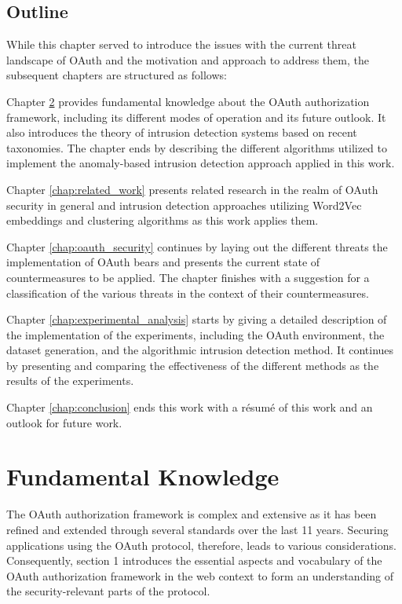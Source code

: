 \documentclass[
    fontsize=12pt,
    headings=small,
    parskip=half,           %
    bibliography=totoc,
    numbers=noenddot,       %
    open=any,               %
    ]{scrreprt}
\begin{document}
\section{Outline}
While this chapter served to introduce the issues with the current threat landscape of OAuth and the motivation and approach to address them, the subsequent chapters are structured as follows:

Chapter \ref{chap:fundamental_knowledge} provides fundamental knowledge about the OAuth authorization framework, including its different modes of operation and its future outlook. It also introduces the theory of intrusion detection systems based on recent taxonomies. The chapter ends by describing the different algorithms utilized to implement the anomaly-based intrusion detection approach applied in this work. 

Chapter \ref{chap:related_work} presents related research in the realm of OAuth security in general and intrusion detection approaches utilizing Word2Vec embeddings and clustering algorithms as this work applies them.

Chapter \ref{chap:oauth_security} continues by laying out the different threats the implementation of OAuth bears and presents the current state of countermeasures to be applied. The chapter finishes with a suggestion for a classification of the various threats in the context of their countermeasures.

Chapter \ref{chap:experimental_analysis} starts by giving a detailed description of the implementation of the experiments, including the OAuth environment, the dataset generation, and the algorithmic intrusion detection method. It continues by presenting and comparing the effectiveness of the different methods as the results of the experiments.

Chapter \ref{chap:conclusion} ends this work with a résumé of this work and an outlook for future work.


\chapter{Fundamental Knowledge}
\label{chap:fundamental_knowledge}
The OAuth authorization framework is complex and extensive as it has been refined and extended through several standards over the last 11 years. Securing applications using the OAuth protocol, therefore, leads to various considerations. Consequently, section 1 introduces the essential aspects and vocabulary of the OAuth authorization framework in the web context to form an understanding of the security-relevant parts of the protocol.
\end{document}
